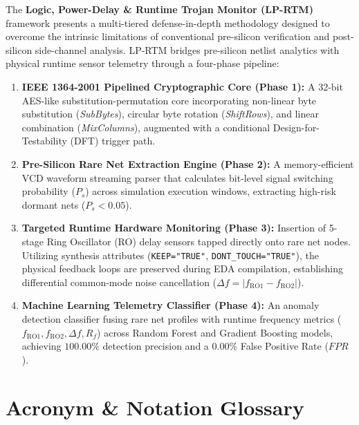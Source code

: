 \documentclass[11pt,a4paper,oneside]{book}
\begin{document}
\vspace{1em}

The \textbf{Logic, Power-Delay \& Runtime Trojan Monitor (LP-RTM)} framework presents a multi-tiered defense-in-depth methodology designed to overcome the intrinsic limitations of conventional pre-silicon verification and post-silicon side-channel analysis. LP-RTM bridges pre-silicon netlist analytics with physical runtime sensor telemetry through a four-phase pipeline:

\begin{enumerate}[leftmargin=2em]
  \item \textbf{IEEE 1364-2001 Pipelined Cryptographic Core (Phase 1):} A 32-bit AES-like substitution-permutation core incorporating non-linear byte substitution (\textit{SubBytes}), circular byte rotation (\textit{ShiftRows}), and linear combination (\textit{MixColumns}), augmented with a conditional Design-for-Testability (DFT) trigger path.
  \item \textbf{Pre-Silicon Rare Net Extraction Engine (Phase 2):} A memory-efficient VCD waveform streaming parser that calculates bit-level signal switching probability ($P_s$) across simulation execution windows, extracting high-risk dormant nets ($P_s < 0.05$).
  \item \textbf{Targeted Runtime Hardware Monitoring (Phase 3):} Insertion of 5-stage Ring Oscillator (RO) delay sensors tapped directly onto rare net nodes. Utilizing synthesis attributes (\texttt{KEEP="TRUE"}, \texttt{DONT\_TOUCH="TRUE"}), the physical feedback loops are preserved during EDA compilation, establishing differential common-mode noise cancellation ($\Delta f = |f_{\text{RO1}} - f_{\text{RO2}}|$).
  \item \textbf{Machine Learning Telemetry Classifier (Phase 4):} An anomaly detection classifier fusing rare net profiles with runtime frequency metrics ($f_{\text{RO1}}, f_{\text{RO2}}, \Delta f, R_f$) across Random Forest and Gradient Boosting models, achieving $100.00\%$ detection precision and a $0.00\%$ False Positive Rate ($FPR$).
\end{enumerate}

\tableofcontents
\listoffigures
\listoftables

\chapter*{Acronym \& Notation Glossary}
\end{document}
